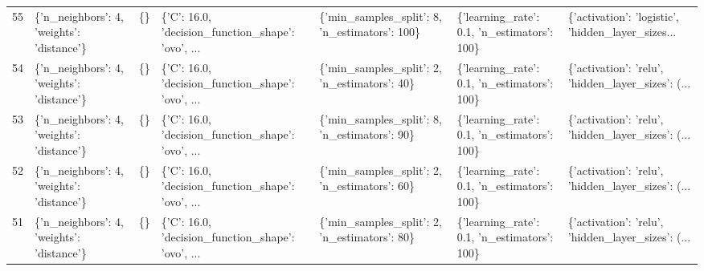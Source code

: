 \begin{tabular}{lllllll}
55  &  \{'n\_neighbors': 4, 'weights': 'distance'\} &  \{\} &  \{'C': 16.0, 'decision\_function\_shape': 'ovo', ... &  \{'min\_samples\_split': 8, 'n\_estimators': 100\} &  \{'learning\_rate': 0.1, 'n\_estimators': 100\} &  \{'activation': 'logistic', 'hidden\_layer\_sizes... \\
54  &  \{'n\_neighbors': 4, 'weights': 'distance'\} &  \{\} &  \{'C': 16.0, 'decision\_function\_shape': 'ovo', ... &   \{'min\_samples\_split': 2, 'n\_estimators': 40\} &  \{'learning\_rate': 0.1, 'n\_estimators': 100\} &  \{'activation': 'relu', 'hidden\_layer\_sizes': (... \\
53  &  \{'n\_neighbors': 4, 'weights': 'distance'\} &  \{\} &  \{'C': 16.0, 'decision\_function\_shape': 'ovo', ... &   \{'min\_samples\_split': 8, 'n\_estimators': 90\} &  \{'learning\_rate': 0.1, 'n\_estimators': 100\} &  \{'activation': 'relu', 'hidden\_layer\_sizes': (... \\
52  &  \{'n\_neighbors': 4, 'weights': 'distance'\} &  \{\} &  \{'C': 16.0, 'decision\_function\_shape': 'ovo', ... &   \{'min\_samples\_split': 2, 'n\_estimators': 60\} &  \{'learning\_rate': 0.1, 'n\_estimators': 100\} &  \{'activation': 'relu', 'hidden\_layer\_sizes': (... \\
51  &  \{'n\_neighbors': 4, 'weights': 'distance'\} &  \{\} &  \{'C': 16.0, 'decision\_function\_shape': 'ovo', ... &   \{'min\_samples\_split': 2, 'n\_estimators': 80\} &  \{'learning\_rate': 0.1, 'n\_estimators': 100\} &  \{'activation': 'relu', 'hidden\_layer\_sizes': (... \\
\bottomrule
\end{tabular}
